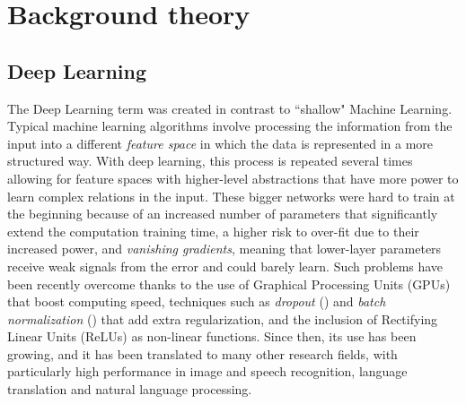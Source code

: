 \chapter{Background theory} \label{Chapter: Theory}




\section{Deep Learning}

The Deep Learning term was created in contrast to ``shallow" Machine Learning. Typical machine learning algorithms involve processing the information from the input into a different \textit{feature space} in which the data is represented in a more structured way. With deep learning, this process is repeated several times allowing for feature spaces with higher-level abstractions that have more power to learn complex relations in the input. These bigger networks were hard to train at the beginning because of an increased number of parameters that significantly extend the computation training time, a higher risk to over-fit due to their increased power, and \textit{vanishing gradients}, meaning that lower-layer parameters receive weak signals from the error and could barely learn. Such problems have been recently overcome thanks to the use of Graphical Processing Units (GPUs) that boost computing speed, techniques such as \textit{dropout} (\cite{Srivastava2014}) and \textit{batch normalization} (\cite{SergeyIoffe2015}) that add extra regularization, and the inclusion of Rectifying Linear Units (ReLUs) as non-linear functions. Since then, its use has been growing, and it has been translated to many other research fields, with particularly high performance in image and speech recognition, language translation and natural language processing.

